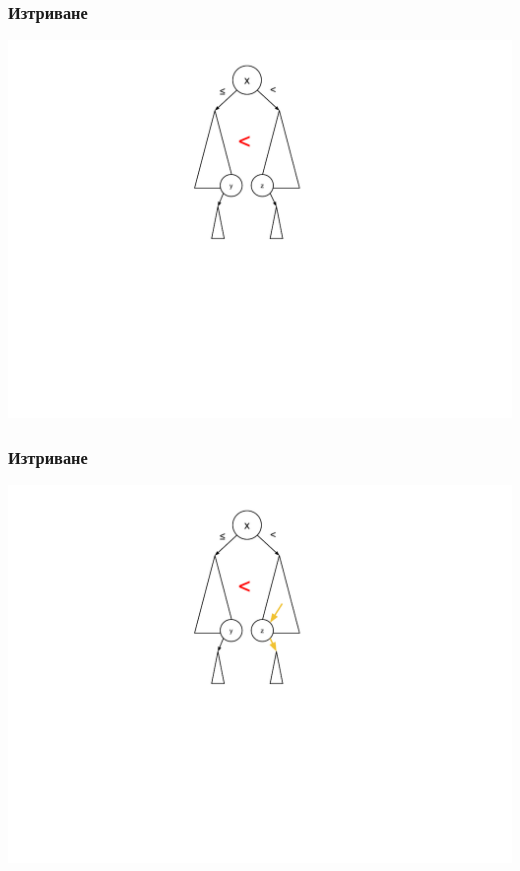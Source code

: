 \documentclass{beamer}
\begin{document}
\begin{frame}[fragile]
\frametitle{Изтриване}

\includegraphics[width=14cm]{images/tree_delete_1}

\end{frame}



\begin{frame}[fragile]
\frametitle{Изтриване}

\includegraphics[width=14cm]{images/tree_delete_2}

\end{frame}
\end{document}
